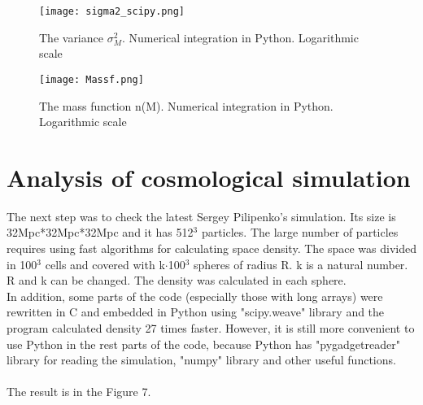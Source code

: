\documentclass[11pt]{article}
\begin{document}
\begin{figure}[H]
\centering
\texttt{[image: sigma2\_scipy.png]}
\caption{The variance $\sigma_{M}^{2}$. Numerical integration in Python. Logarithmic scale}  
\end{figure}

\begin{figure}[H]
\centering
\texttt{[image: Massf.png]}
\caption{The mass function n(M). Numerical integration in Python. Logarithmic scale}  
\end{figure}

\section{Analysis of cosmological simulation}
The next step was to check the latest Sergey Pilipenko's simulation. Its size is 32Mpc*32Mpc*32Mpc and it has 512$^3$ particles. The large number of particles requires using fast algorithms for calculating space density. The space was divided in 100$^3$ cells and covered with k$\cdot$100$^3$ spheres of radius R. k is a natural number. R and k can be changed. The density was calculated in each sphere. \\
In addition, some parts of the code (especially those with long arrays) were rewritten in C and embedded in Python using "scipy.weave" library and the program calculated density 27 times faster. However, it is still more convenient to use Python in the rest parts of the code, because Python has "pygadgetreader" library for reading the simulation, "numpy" library and other useful functions.\\
\\
The result is in the Figure 7.
\lstset{language=Python}
\end{document}
